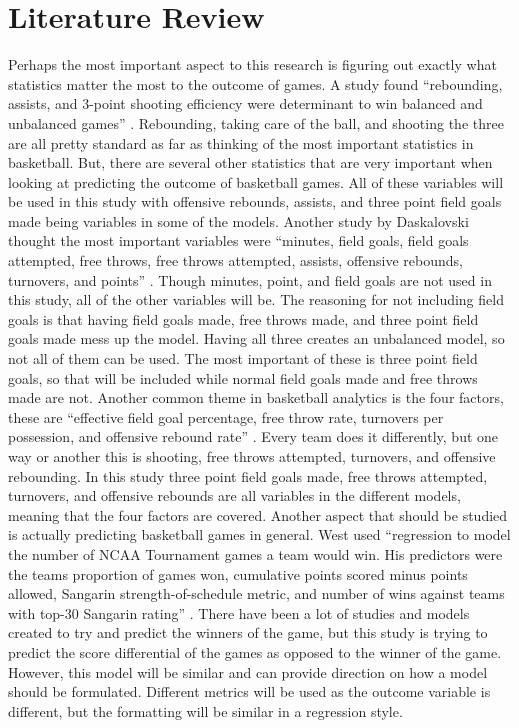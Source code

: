 \documentclass{article}
\begin{document}
\section{Literature Review}
Perhaps the most important aspect to this research is figuring out exactly what statistics matter the most to the outcome of games. A study found “rebounding, assists, and 3-point shooting efficiency were determinant to win balanced and unbalanced games” \citep{giovanini}. Rebounding, taking care of the ball, and shooting the three are all pretty standard as far as thinking of the most important statistics in basketball. But, there are several other statistics that are very important when looking at predicting the outcome of basketball games. All of these variables will be used in this study with offensive rebounds, assists, and three point field goals made being variables in some of the models. Another study by Daskalovski thought the most important variables were “minutes, field goals, field goals attempted, free throws, free throws attempted, assists, offensive rebounds, turnovers, and points” \citep{daskalovski}. Though minutes, point, and field goals are not used in this study, all of the other variables will be. The reasoning for not including field goals is that having field goals made, free throws made, and three point field goals made mess up the model. Having all three creates an unbalanced model, so not all of them can be used. The most important of these is three point field goals, so that will be included while normal field goals made and free throws made are not. Another common theme in basketball analytics is the four factors, these are “effective field goal percentage, free throw rate, turnovers per possession, and offensive rebound rate” \citep{baghal}. Every team does it differently, but one way or another this is shooting, free throws attempted, turnovers, and offensive rebounding. In this study three point field goals made, free throws attempted, turnovers, and offensive rebounds are all variables in the different models, meaning that the four factors are covered. 
\newline \indent Another aspect that should be studied is actually predicting basketball games in general. West used “regression to model the number of NCAA Tournament games a team would win. His predictors were the teams proportion of games won, cumulative points scored minus points allowed, Sangarin strength-of-schedule metric, and number of wins against teams with top-30 Sangarin rating” \citep{gupta}. There have been a lot of studies and models created to try and predict the winners of the game, but this study is trying to predict the score differential of the games as opposed to the winner of the game. However, this model will be similar and can provide direction on how a model should be formulated. Different metrics will be used as the outcome variable is different, but the formatting will be similar in a regression style. 
\end{document}
